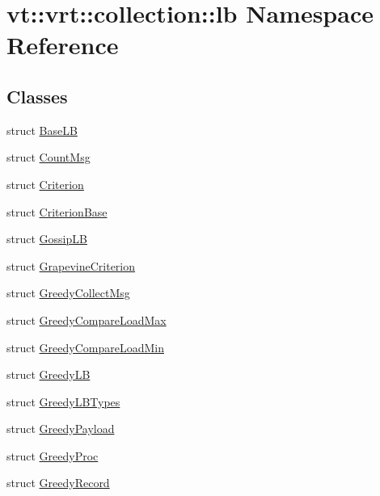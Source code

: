 \hypertarget{namespacevt_1_1vrt_1_1collection_1_1lb}{}\section{vt\+:\+:vrt\+:\+:collection\+:\+:lb Namespace Reference}
\label{namespacevt_1_1vrt_1_1collection_1_1lb}
\subsection*{Classes}
\begin{DoxyCompactItemize}
\item 
struct \hyperlink{structvt_1_1vrt_1_1collection_1_1lb_1_1_base_l_b}{Base\+LB}
\item 
struct \hyperlink{structvt_1_1vrt_1_1collection_1_1lb_1_1_count_msg}{Count\+Msg}
\item 
struct \hyperlink{structvt_1_1vrt_1_1collection_1_1lb_1_1_criterion}{Criterion}
\item 
struct \hyperlink{structvt_1_1vrt_1_1collection_1_1lb_1_1_criterion_base}{Criterion\+Base}
\item 
struct \hyperlink{structvt_1_1vrt_1_1collection_1_1lb_1_1_gossip_l_b}{Gossip\+LB}
\item 
struct \hyperlink{structvt_1_1vrt_1_1collection_1_1lb_1_1_grapevine_criterion}{Grapevine\+Criterion}
\item 
struct \hyperlink{structvt_1_1vrt_1_1collection_1_1lb_1_1_greedy_collect_msg}{Greedy\+Collect\+Msg}
\item 
struct \hyperlink{structvt_1_1vrt_1_1collection_1_1lb_1_1_greedy_compare_load_max}{Greedy\+Compare\+Load\+Max}
\item 
struct \hyperlink{structvt_1_1vrt_1_1collection_1_1lb_1_1_greedy_compare_load_min}{Greedy\+Compare\+Load\+Min}
\item 
struct \hyperlink{structvt_1_1vrt_1_1collection_1_1lb_1_1_greedy_l_b}{Greedy\+LB}
\item 
struct \hyperlink{structvt_1_1vrt_1_1collection_1_1lb_1_1_greedy_l_b_types}{Greedy\+L\+B\+Types}
\item 
struct \hyperlink{structvt_1_1vrt_1_1collection_1_1lb_1_1_greedy_payload}{Greedy\+Payload}
\item 
struct \hyperlink{structvt_1_1vrt_1_1collection_1_1lb_1_1_greedy_proc}{Greedy\+Proc}
\item 
struct \hyperlink{structvt_1_1vrt_1_1collection_1_1lb_1_1_greedy_record}{Greedy\+Record}
\item 

\end{DoxyCompactItemize}
